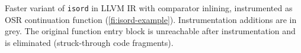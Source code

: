 \label{fig:isordascto} Faster variant of {\tt isord} in LLVM IR with comparator inlining, instrumented as OSR continuation function (\myfigure\ref{fi:isord-example}). Instrumentation additions are in grey. The original function entry block is unreachable after instrumentation and is eliminated (struck-through code fragments).